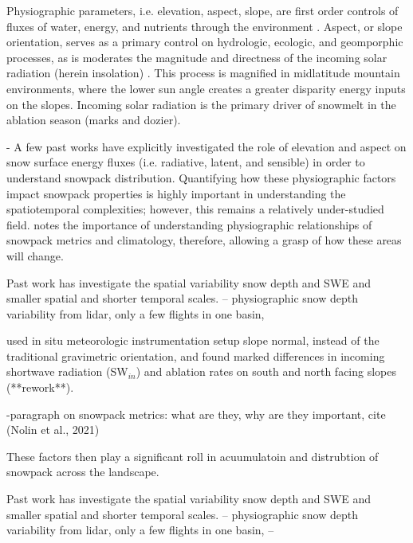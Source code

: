 Physiographic parameters, i.e. elevation, aspect, slope, are first order controls of fluxes of water, energy, and nutrients through the environment  \citep{pelletierWhichWayYou2018a}. Aspect, or slope orientation, serves as a primary control on hydrologic, ecologic, and geomporphic processes, as is moderates the magnitude and directness of the incoming solar radiation (herein insolation) \citep{broxtonRoleAspectQuantify2009}. This process is magnified in midlatitude mountain environments, where the lower sun angle creates a greater disparity energy inputs on the slopes. Incoming solar radiation is the primary driver of snowmelt in the ablation season (marks and dozier). 


- A few past works have explicitly investigated the role of elevation and aspect on snow surface energy fluxes (i.e. radiative, latent, and sensible) in order to understand snowpack distribution. Quantifying how these physiographic factors impact snowpack properties is highly important in understanding the spatiotemporal complexities; however, this remains a relatively under-studied field. \cite{musselmanWinterMeltTrends2021} notes the importance of understanding physiographic relationships of snowpack metrics and climatology, therefore, allowing a grasp of how these areas will change. 

Past work has investigate the spatial variability snow depth and SWE and smaller spatial and shorter temporal scales.
-- \citep{kirchnerLiDARMeasurementSeasonal2014, tennantRegionalSensitivitiesSeasonal2017} physiographic snow depth variability from lidar, only a few flights in one basin,


\cite{pomeroyVariationSurfaceEnergetics2003} used in situ meteorologic instrumentation setup slope normal, instead of the traditional gravimetric orientation, and found marked differences in incoming shortwave radiation (SW$_{in}$) and ablation rates on south and north facing slopes (**rework**). \citep{mazzottiCanopyStructureTopography2023, lopez-morenoEffectSlopeAspect2014}



-paragraph on snowpack metrics: what are they, why are they important, cite (Nolin et al., 2021)

These factors then play a significant roll in acuumulatoin and distrubtion of snowpack across the landscape.


Past work has investigate the spatial variability snow depth and SWE and smaller spatial and shorter temporal scales.
-- \citep{kirchnerLiDARMeasurementSeasonal2014, tennantRegionalSensitivitiesSeasonal2017} physiographic snow depth variability from lidar, only a few flights in one basin,
-- 

